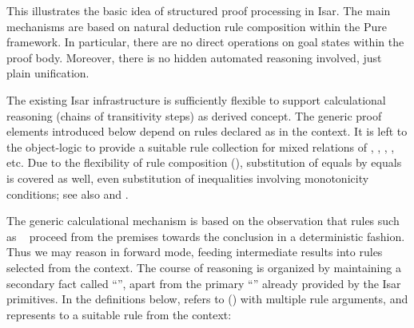 \begin{isabellebody}
\begin{isamarkuptext}
  \medskip This illustrates the basic idea of structured proof
  processing in Isar.  The main mechanisms are based on natural
  deduction rule composition within the Pure framework.  In
  particular, there are no direct operations on goal states within the
  proof body.  Moreover, there is no hidden automated reasoning
  involved, just plain unification.%
\end{isamarkuptext}%
\isamarkuptrue%
%
\isamarkuptrue%
%
\begin{isamarkuptext}%
The existing Isar infrastructure is sufficiently flexible to support
  calculational reasoning (chains of transitivity steps) as derived
  concept.  The generic proof elements introduced below depend on
  rules declared as \hyperlink{attribute.trans}{\mbox{}} in the context.  It is left to
  the object-logic to provide a suitable rule collection for mixed
  relations of \isa{{\isachardoublequote}{\isacharequal}{\isachardoublequote}}, \isa{{\isachardoublequote}{\isacharless}{\isachardoublequote}}, \isa{{\isachardoublequote}{\isasymle}{\isachardoublequote}}, \isa{{\isachardoublequote}{\isasymsubset}{\isachardoublequote}},
  \isa{{\isachardoublequote}{\isasymsubseteq}{\isachardoublequote}} etc.  Due to the flexibility of rule composition
  (), substitution of equals by
  equals is covered as well, even substitution of inequalities
  involving monotonicity conditions; see also \cite[\S6]{Wenzel-PhD}
  and \cite{Bauer-Wenzel:2001}.

  The generic calculational mechanism is based on the observation that
  rules such as ~
  proceed from the premises towards the conclusion in a deterministic
  fashion.  Thus we may reason in forward mode, feeding intermediate
  results into rules selected from the context.  The course of
  reasoning is organized by maintaining a secondary fact called
  ``\hyperlink{fact.calculation}{\mbox{}}'', apart from the primary ``\hyperlink{fact.this}{\mbox{}}''
  already provided by the Isar primitives.  In the definitions below,
  \hyperlink{attribute.OF}{\mbox{}} refers to \hyperlink{inference.resolution}{\mbox{}}
  () with multiple rule arguments,
  and  represents to a suitable rule from the context:


\end{isamarkuptext}
\end{isabellebody}
